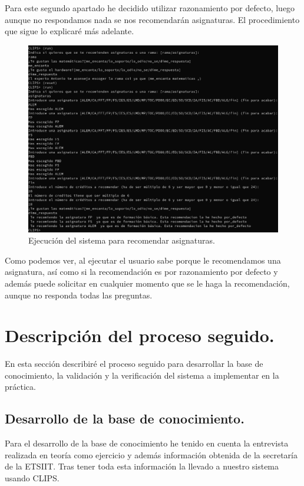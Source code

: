\documentclass[12pt, spanish]{article}
\begin{document}
Para este segundo apartado he decidido utilizar razonamiento por defecto, luego aunque no respondamos nada se nos recomendarán asignaturas. El procedimiento que sigue lo explicaré más adelante.

\begin{figure}[H]
	\centering
	\includegraphics[scale=0.4]{ej_asig.png}
	\caption{Ejecución del sistema para recomendar asignaturas.}
	\label{ej_asig}
\end{figure}

Como podemos ver, al ejecutar el usuario sabe porque le recomendamos una asignatura, así como si la recomendación es por razonamiento por defecto y además puede solicitar en cualquier momento que se le haga la recomendación, aunque no responda todas las preguntas. 

\newpage

\section{Descripción del proceso seguido.}

En esta sección describiré el proceso seguido para desarrollar la base de conocimiento, la validación y la verificación del sistema a implementar en la práctica.

\subsection{Desarrollo de la base de conocimiento.}

Para el desarrollo de la base de conocimiento he tenido en cuenta la entrevista realizada en teoría como ejercicio y además información obtenida de la secretaría de la ETSIIT. Tras tener toda esta información la llevado a nuestro sistema usando CLIPS.
\end{document}
